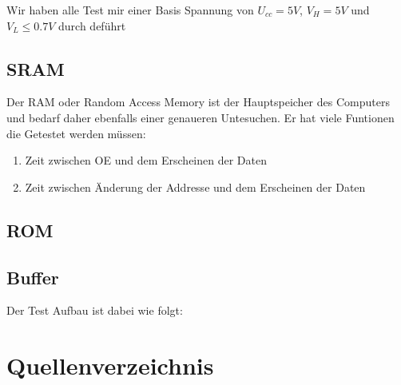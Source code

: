\documentclass{scrartcl}
\begin{document}
Wir haben alle Test mir einer Basis Spannung von $U_{cc} = 5V$, $V_H = 5V$ und $V_L \leq 0.7V$ durch deführt

\subsection{SRAM}
Der RAM oder Random Access Memory ist der Hauptspeicher des Computers und bedarf daher ebenfalls einer genaueren Untesuchen. Er hat viele Funtionen die Getestet werden müssen:
\begin{enumerate} 
\item Zeit zwischen OE und dem Erscheinen der Daten
\item Zeit zwischen Änderung der Addresse und dem Erscheinen der Daten
\end{enumerate}

\subsection{ROM}

\subsection{Buffer}

Der Test Aufbau ist dabei wie folgt:

\section{Quellenverzeichnis}

\printbibliography{}
\end{document}
